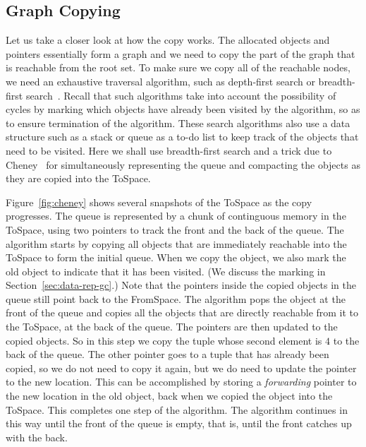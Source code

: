 \documentclass[11pt]{book}
\begin{document}
\subsection{Graph Copying}

Let us take a closer look at how the copy works. The allocated objects
and pointers essentially form a graph and we need to copy the part of
the graph that is reachable from the root set. To make sure we copy
all of the reachable nodes, we need an exhaustive traversal algorithm,
such as depth-first search or breadth-first
search~\citep{Moore:1959aa,Cormen:2001uq}. Recall that such algorithms
take into account the possibility of cycles by marking which objects
have already been visited by the algorithm, so as to ensure
termination of the algorithm. These search algorithms also use a data
structure such as a stack or queue as a to-do list to keep track of
the objects that need to be visited. Here we shall use breadth-first
search and a trick due to Cheney~\citep{Cheney:1970aa} for
simultaneously representing the queue and compacting the objects as
they are copied into the ToSpace.

Figure~\ref{fig:cheney} shows several snapshots of the ToSpace as the
copy progresses. The queue is represented by a chunk of continguous
memory in the ToSpace, using two pointers to track the front and the
back of the queue. The algorithm starts by copying all objects that
are immediately reachable into the ToSpace to form the initial queue.
When we copy the object, we also mark the old object to indicate that
it has been visited. (We discuss the marking in
Section~\ref{sec:data-rep-gc}.) Note that the pointers inside the
copied objects in the queue still point back to the FromSpace. The
algorithm pops the object at the front of the queue and copies all the
objects that are directly reachable from it to the ToSpace, at the
back of the queue. The pointers are then updated to the copied
objects. So in this step we copy the tuple whose second element is $4$
to the back of the queue. The other pointer goes to a tuple that has
already been copied, so we do not need to copy it again, but we do
need to update the pointer to the new location. This can be
accomplished by storing a \emph{forwarding} pointer to the new
location in the old object, back when we copied the object into the
ToSpace. This completes one step of the algorithm. The algorithm
continues in this way until the front of the queue is empty, that is,
until the front catches up with the back.
\end{document}
